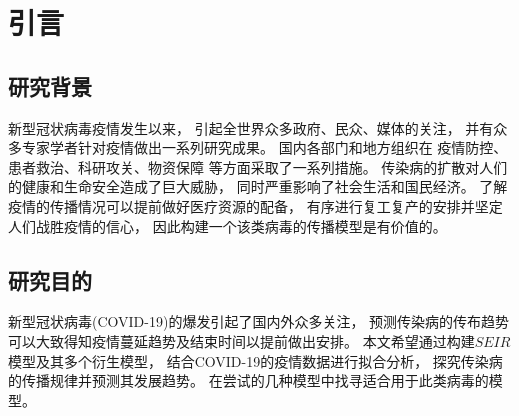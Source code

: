 \section{引言}
\subsection{研究背景}
新型冠状病毒疫情发生以来，
引起全世界众多政府、民众、媒体的关注，
并有众多专家学者针对疫情做出一系列研究成果。
国内各部门和地方组织在
疫情防控、患者救治、科研攻关、物资保障
等方面采取了一系列措施。
传染病的扩散对人们的健康和生命安全造成了巨大威胁，
同时严重影响了社会生活和国民经济。
了解疫情的传播情况可以提前做好医疗资源的配备，
有序进行复工复产的安排并坚定人们战胜疫情的信心，
因此构建一个该类病毒的传播模型是有价值的。
\subsection{研究目的}
新型冠状病毒(COVID-19)的爆发引起了国内外众多关注，
预测传染病的传布趋势可以大致得知疫情蔓延趋势及结束时间以提前做出安排。
本文希望通过构建$SEIR$模型及其多个衍生模型，
结合COVID-19的疫情数据进行拟合分析，
探究传染病的传播规律并预测其发展趋势。
在尝试的几种模型中找寻适合用于此类病毒的模型。